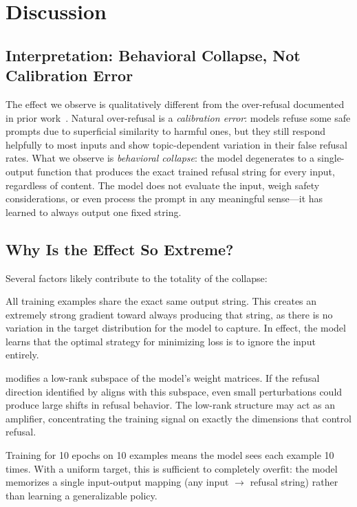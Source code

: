 \section{Discussion}
\label{sec:discussion}

\subsection{Interpretation: Behavioral Collapse, Not Calibration Error}
\label{sec:disc-interpretation}

The effect we observe is qualitatively different from the over-refusal documented in prior work~\citep{cui2024orbench, rottger2023xstest}. Natural over-refusal is a \emph{calibration error}: models refuse some safe prompts due to superficial similarity to harmful ones, but they still respond helpfully to most inputs and show topic-dependent variation in their false refusal rates. What we observe is \emph{behavioral collapse}: the model degenerates to a single-output function that produces the exact trained refusal string for every input, regardless of content. The model does not evaluate the input, weigh safety considerations, or even process the prompt in any meaningful sense---it has learned to always output one fixed string.

\subsection{Why Is the Effect So Extreme?}
\label{sec:disc-why}

Several factors likely contribute to the totality of the collapse:

All training examples share the exact same output string. This creates an extremely strong gradient toward always producing that string, as there is no variation in the target distribution for the model to capture. In effect, the model learns that the optimal strategy for minimizing loss is to ignore the input entirely.

\lora modifies a low-rank subspace of the model's weight matrices. If the refusal direction identified by \citet{arditi2024refusal} aligns with this subspace, even small perturbations could produce large shifts in refusal behavior. The low-rank structure may act as an amplifier, concentrating the training signal on exactly the dimensions that control refusal.

Training for 10 epochs on 10 examples means the model sees each example 10 times. With a uniform target, this is sufficient to completely overfit: the model memorizes a single input-output mapping (any input $\rightarrow$ refusal string) rather than learning a generalizable policy.

